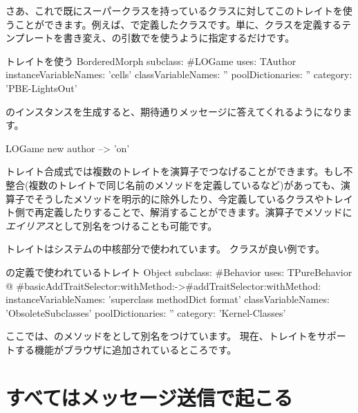 \documentclass[a4paper,10pt,twoside]{book}
\begin{document}
\noindent
さあ、これで既にスーパークラスを持っているクラスに対してこのトレイトを使うことができます。例えば、で定義したクラスです。単に、クラスを定義するテンプレートを書き変え、の引数でを使うように指定するだけです。

\begin{classdef}[sbegamewithtrait]{トレイトを使う}
BorderedMorph subclass: #LOGame
	uses: TAuthor
	instanceVariableNames: 'cells'
	classVariableNames: ''
	poolDictionaries: ''
	category: 'PBE-LightsOut'
\end{classdef}

のインスタンスを生成すると、期待通りメッセージに答えてくれるようになります。

\begin{code}{}
LOGame new author --> 'on'
\end{code}

トレイト合成式では複数のトレイトを\ct{+}演算子でつなげることができます。もし不整合(複数のトレイトで同じ名前のメソッドを定義しているなど)があっても、\ct{-}演算子でそうしたメソッドを明示的に除外したり、今定義しているクラスやトレイト側で再定義したりすることで、解消することができます。演算子でメソッドに\emph{エイリアス}として別名をつけることも可能です。

トレイトはシステムの中核部分で使われています。
\mbox{}クラスが良い例です。

\begin{classdef}[behaviorwithtraits]{の定義で使われているトレイト}
Object subclass: #Behavior
	uses: TPureBehavior @ {#basicAddTraitSelector:withMethod:->#addTraitSelector:withMethod:}
	instanceVariableNames: 'superclass methodDict format'
	classVariableNames: 'ObsoleteSubclasses'
	poolDictionaries: ''
	category: 'Kernel-Classes'
\end{classdef}
\noindent
ここでは、のメソッドをとして別名をつけています。
現在、トレイトをサポートする機能がブラウザに追加されているところです。


\section{すべてはメッセージ送信で起こる}
\end{document}

